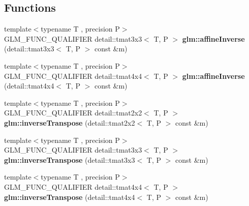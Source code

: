 \subsection*{Functions}
\begin{DoxyCompactItemize}
\item 
{\footnotesize template$<$typename T , precision P$>$ }\\G\+L\+M\+\_\+\+F\+U\+N\+C\+\_\+\+Q\+U\+A\+L\+I\+F\+I\+ER detail\+::tmat3x3$<$ T, P $>$ {\bfseries glm\+::affine\+Inverse} (detail\+::tmat3x3$<$ T, P $>$ const \&m)\hypertarget{namespaceglm_ae987f6c5b71756c91d1a4a6f65616ac9}{}\label{namespaceglm_ae987f6c5b71756c91d1a4a6f65616ac9}

\item 
{\footnotesize template$<$typename T , precision P$>$ }\\G\+L\+M\+\_\+\+F\+U\+N\+C\+\_\+\+Q\+U\+A\+L\+I\+F\+I\+ER detail\+::tmat4x4$<$ T, P $>$ {\bfseries glm\+::affine\+Inverse} (detail\+::tmat4x4$<$ T, P $>$ const \&m)\hypertarget{namespaceglm_a9c15fbd234b0504882c00b6bccc0f818}{}\label{namespaceglm_a9c15fbd234b0504882c00b6bccc0f818}

\item 
{\footnotesize template$<$typename T , precision P$>$ }\\G\+L\+M\+\_\+\+F\+U\+N\+C\+\_\+\+Q\+U\+A\+L\+I\+F\+I\+ER detail\+::tmat2x2$<$ T, P $>$ {\bfseries glm\+::inverse\+Transpose} (detail\+::tmat2x2$<$ T, P $>$ const \&m)\hypertarget{namespaceglm_aadb5ab47ae129fe2b90f976465999629}{}\label{namespaceglm_aadb5ab47ae129fe2b90f976465999629}

\item 
{\footnotesize template$<$typename T , precision P$>$ }\\G\+L\+M\+\_\+\+F\+U\+N\+C\+\_\+\+Q\+U\+A\+L\+I\+F\+I\+ER detail\+::tmat3x3$<$ T, P $>$ {\bfseries glm\+::inverse\+Transpose} (detail\+::tmat3x3$<$ T, P $>$ const \&m)\hypertarget{namespaceglm_a821bc03bbd402ee2f77ba43c17a9c24e}{}\label{namespaceglm_a821bc03bbd402ee2f77ba43c17a9c24e}

\item 
{\footnotesize template$<$typename T , precision P$>$ }\\G\+L\+M\+\_\+\+F\+U\+N\+C\+\_\+\+Q\+U\+A\+L\+I\+F\+I\+ER detail\+::tmat4x4$<$ T, P $>$ {\bfseries glm\+::inverse\+Transpose} (detail\+::tmat4x4$<$ T, P $>$ const \&m)\hypertarget{namespaceglm_aaf03d778a4023049e562c382ad880d56}{}\label{namespaceglm_aaf03d778a4023049e562c382ad880d56}

\end{DoxyCompactItemize}


